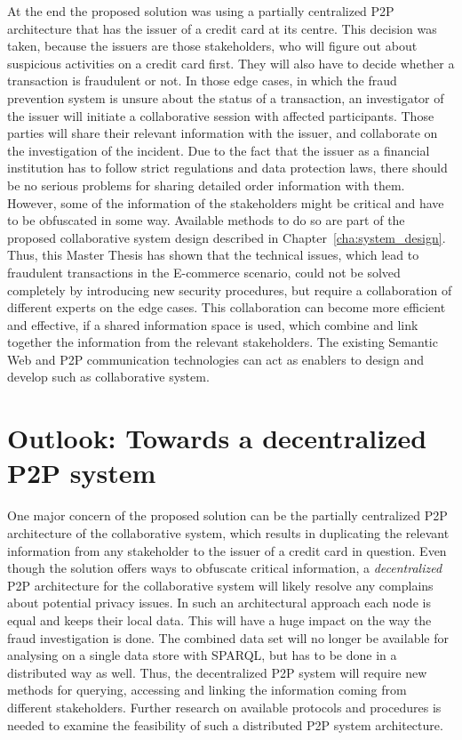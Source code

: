 At the end the proposed solution was using a partially centralized \gls{P2P} architecture that has the issuer of a credit card at its centre. This decision was taken, because the issuers are those stakeholders, who will figure out about suspicious activities on a credit card first. They will also have to decide whether a transaction is fraudulent or not. In those edge cases, in which the fraud prevention system is unsure about the status of a transaction, an investigator of the issuer will initiate a collaborative session with affected participants. Those parties will share their relevant information with the issuer, and collaborate on the investigation of the incident. Due to the fact that the issuer as a financial institution has to follow strict regulations and data protection laws, there should be no serious problems for sharing detailed order information with them. However, some of the information of the stakeholders might be critical and have to be obfuscated in some way. Available methods to do so are part of the proposed collaborative system design described in Chapter~\ref{cha:system_design}. \\

Thus, this Master Thesis has shown that the technical issues, which lead to fraudulent transactions in the \gls{E-commerce} scenario, could not be solved completely by introducing new security procedures, but require a collaboration of different experts on the edge cases. This collaboration can become more efficient and effective, if a shared information space is used, which combine and link together the information from the relevant stakeholders. The existing Semantic Web and \gls{P2P} communication technologies can act as enablers to design and develop such as collaborative system.

\section{Outlook: Towards a decentralized \gls{P2P} system}
\label{sec:p2p_decentralized_system}

One major concern of the proposed solution can be the partially centralized \gls{P2P} architecture of the collaborative system, which results in duplicating the relevant information from any stakeholder to the issuer of a credit card in question. Even though the solution offers ways to obfuscate critical information, a \emph{decentralized} \gls{P2P} architecture for the collaborative system will likely resolve any complains about potential privacy issues. In such an architectural approach each node is equal and keeps their local data. This will have a huge impact on the way the fraud investigation is done. The combined data set will no longer be available for analysing on a single data store with \gls{SPARQL}, but has to be done in a distributed way as well. Thus, the decentralized \gls{P2P} system will require new methods for querying, accessing and linking the information coming from different stakeholders. Further research on available protocols and procedures is needed to examine the feasibility of such a distributed \gls{P2P} system architecture.


